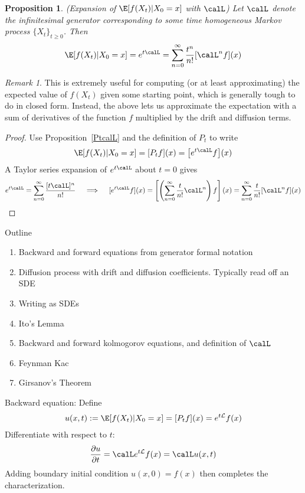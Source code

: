 \documentclass[12pt]{article}
\theoremstyle{plain}
\newtheorem{prop}[thm]{Proposition}
\theoremstyle{definition}
\theoremstyle{remark}
\newtheorem*{rmk}{Remark}
\newcommand{\sumninfz}{\sum^\infty_{n=0}}
\begin{document}
\clearpage
\begin{prop}\emph{(Expansion of $\E[f(X_t)|X_0=x]$ with $\calL$)}
Let $\calL$ denote the infinitesimal generator corresponding to some
time homogeneous Markov process $\{X_t\}_{t\geq 0}$.
Then
\begin{align*}
  \E[f(X_t)|X_0=x]
  =
  e^{t\calL}
  =
  \sumninfz
  \frac{t^n}{n!} [\calL^nf](x)
\end{align*}
\end{prop}
\begin{rmk}
This is extremely useful for computing (or at least approximating) the
expected value of $f(X_t)$ given some starting point, which is generally
tough to do in closed form.
Instead, the above lets us approximate the expectation with a sum of
derivatives of the function $f$ multiplied by the drift and diffusion
terms.
\end{rmk}
\begin{proof}
Use Proposition~\ref{PtcalL} and the definition of $P_t$ to write
\begin{align*}
  \E[f(X_t)|X_0=x]
  =
  [P_tf](x)
  =
  \big[
  e^{t\calL}
  f
  \big](x)
\end{align*}
A Taylor series expansion of $e^{t\calL}$ about $t=0$ gives
\begin{align*}
  e^{t\calL}
  =
  \sumninfz
  \frac{[t\calL]^n}{n!}
  \quad\implies\quad
  [e^{t\calL}f](x)
  =
  \left[
  \left(
  \sumninfz
  \frac{t}{n!}
  \calL^n
  \right)
  f
  \right]
  (x)
  =
  \sumninfz
  \frac{t}{n!}
  [\calL^n f]
  (x)
\end{align*}
\end{proof}


\clearpage
Outline
\begin{enumerate}
  \item Backward and forward equations from generator formal notation
  \item Diffusion process with drift and diffusion coefficients.
    Typically read off an SDE
  \item Writing as SDEs
  \item Ito's Lemma
  \item Backward and forward kolmogorov equations, and definition of
    $\calL$
  \item Feynman Kac
  \item Girsanov's Theorem
\end{enumerate}

Backward equation: Define
\begin{align*}
  u(x,t):=\E[f(X_t)|X_0=x]
  = [P_tf](x) = e^{t\cal L}f(x)
\end{align*}
Differentiate with respect to $t$:
\begin{align*}
  \frac{\partial u}{\partial t}
  =
  \calL
  e^{t\cal L}
  f(x)
  =
  \calL
  u(x,t)
\end{align*}
Adding boundary initial condition $u(x,0)=f(x)$ then completes the
characterization.
\end{document}
